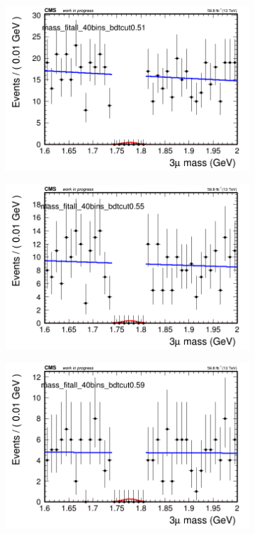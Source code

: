 \begin{figure}[H]
\begin{subfigure}{0.2\textwidth}
        \caption{}
    \end{subfigure}
    \begin{subfigure}{0.2\textwidth}
        \includegraphics[width=\textwidth]{unfixed_exp/plots/all/massfit_all_40bins_bdtcut0.51.png}
        \caption{}
    \end{subfigure}
    \begin{subfigure}{0.2\textwidth}
        \includegraphics[width=\textwidth]{unfixed_exp/plots/all/massfit_all_40bins_bdtcut0.55.png}
        \caption{}
    \end{subfigure}
    \begin{subfigure}{0.2\textwidth}
        \includegraphics[width=\textwidth]{unfixed_exp/plots/all/massfit_all_40bins_bdtcut0.59.png}

\end{subfigure}
\end{figure}
